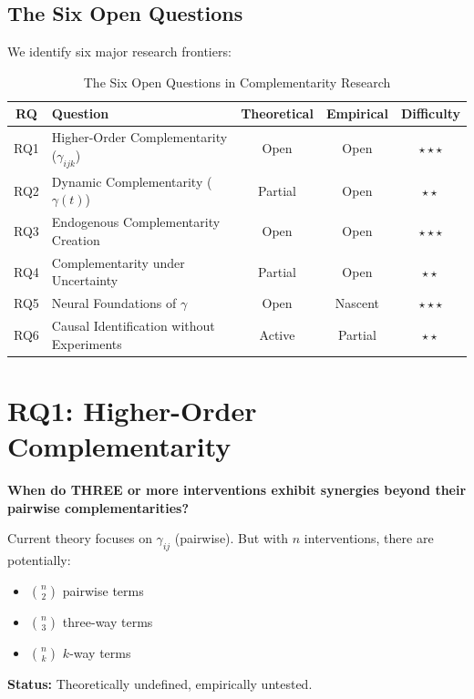 \subsection{The Six Open Questions}

We identify six major research frontiers:

\begin{table}[h]
\centering
\caption{The Six Open Questions in Complementarity Research}
\label{tab:six-questions}
\renewcommand{\arraystretch}{1.4}
\begin{tabular}{@{}clccc@{}}
\toprule
\textbf{RQ} & \textbf{Question} & \textbf{Theoretical} & \textbf{Empirical} & \textbf{Difficulty} \\
\midrule
RQ1 & Higher-Order Complementarity ($\gamma_{ijk}$) & Open & Open & $\star\star\star$ \\
RQ2 & Dynamic Complementarity ($\gamma(t)$) & Partial & Open & $\star\star$ \\
RQ3 & Endogenous Complementarity Creation & Open & Open & $\star\star\star$ \\
RQ4 & Complementarity under Uncertainty & Partial & Open & $\star\star$ \\
RQ5 & Neural Foundations of $\gamma$ & Open & Nascent & $\star\star\star$ \\
RQ6 & Causal Identification without Experiments & Active & Partial & $\star\star$ \\
\bottomrule
\end{tabular}
\end{table}

\section{RQ1: Higher-Order Complementarity}
\label{sec:rq1-higher-order}

\begin{tcolorbox}[colback=red!5!white,colframe=red!75!black,title=\textbf{Research Question 1}]
\textbf{When do THREE or more interventions exhibit synergies beyond their pairwise complementarities?}

Current theory focuses on $\gamma_{ij}$ (pairwise). But with $n$ interventions, there are potentially:
\begin{itemize}[noitemsep]
    \item $\binom{n}{2}$ pairwise terms
    \item $\binom{n}{3}$ three-way terms
    \item $\binom{n}{k}$ $k$-way terms
\end{itemize}

\textbf{Status:} Theoretically undefined, empirically untested.
\end{tcolorbox}

